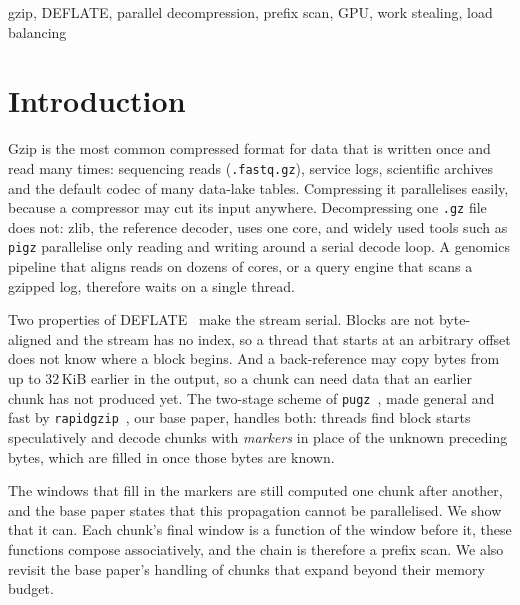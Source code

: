 \documentclass[conference]{IEEEtran}
\begin{document}
\begin{IEEEkeywords}
gzip, DEFLATE, parallel decompression, prefix scan, GPU, work stealing, load balancing
\end{IEEEkeywords}

\section{Introduction}

Gzip is the most common compressed format for data that is written once and read
many times: sequencing reads (\texttt{.fastq.gz}), service logs, scientific archives
and the default codec of many data-lake tables. Compressing it parallelises easily,
because a compressor may cut its input anywhere. Decompressing one \texttt{.gz} file
does not: zlib, the reference decoder, uses one core, and widely used tools such as
\texttt{pigz} parallelise only reading and writing around a serial decode loop. A
genomics pipeline that aligns reads on dozens of cores, or a query engine that scans
a gzipped log, therefore waits on a single thread.

Two properties of DEFLATE~\cite{deflate} make the stream serial. Blocks are not
byte-aligned and the stream has no index, so a thread that starts at an arbitrary
offset does not know where a block begins. And a back-reference may copy bytes from
up to 32\,KiB earlier in the output, so a chunk can need data that an earlier chunk
has not produced yet. The two-stage scheme of \texttt{pugz}~\cite{pugz}, made general
and fast by \texttt{rapidgzip}~\cite{rapidgzip}, our base paper, handles both: threads
find block starts speculatively and decode chunks with \emph{markers} in place of the
unknown preceding bytes, which are filled in once those bytes are known.

The windows that fill in the markers are still computed one chunk after another,
and the base paper states that this propagation cannot be parallelised. We show that
it can. Each chunk's final window is a function of the window before it, these
functions compose associatively, and the chain is therefore a prefix scan. We also
revisit the base paper's handling of chunks that expand beyond their memory budget.
\end{document}
